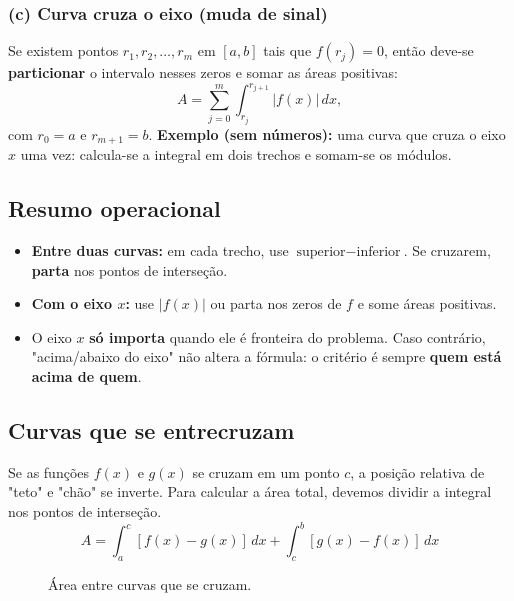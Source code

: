 \subsubsection*{(c) Curva cruza o eixo (muda de sinal)}
Se existem pontos \(r_1,r_2,\dots,r_m\) em \([a,b]\) tais que \(f(r_j)=0\), então deve-se \textbf{particionar} o intervalo nesses zeros e somar as áreas positivas:
\[
A=\sum_{j=0}^{m}\int_{r_j}^{r_{j+1}} |f(x)|\,dx,
\]
com \(r_0=a\) e \(r_{m+1}=b\).
\textbf{Exemplo (sem números):} uma curva que cruza o eixo \(x\) uma vez: calcula-se a integral em dois trechos e somam-se os módulos.

\subsection{Resumo operacional}
\begin{itemize}
  \item \textbf{Entre duas curvas:} em cada trecho, use \(\text{superior} - \text{inferior}\). Se cruzarem, \textbf{parta} nos pontos de interseção.
  \item \textbf{Com o eixo \(x\):} use \(|f(x)|\) ou parta nos zeros de \(f\) e some áreas positivas.
  \item O eixo \(x\) \textbf{só importa} quando ele é fronteira do problema. \newline Caso contrário, "acima/abaixo do eixo" não altera a fórmula: o critério é sempre \textbf{quem está acima de quem}.
\end{itemize}


\subsection{Curvas que se entrecruzam}
Se as funções $f(x)$ e $g(x)$ se cruzam em um ponto $c$, a posição relativa de "teto" e "chão" se inverte. Para calcular a área total, devemos dividir a integral nos pontos de interseção.
\begin{equation}
A = \int_{a}^{c} [f(x) - g(x)] \, dx + \int_{c}^{b} [g(x) - f(x)] \, dx
\end{equation}

\begin{figure}[hbt]
\centering
{}
\caption{Área entre curvas que se cruzam.}
\label{Fig_funcoes_cruzadas}
\end{figure}

